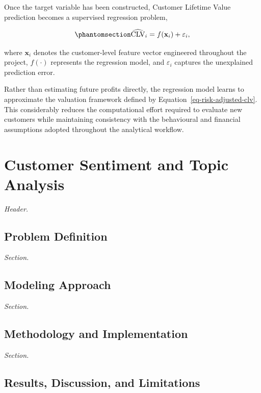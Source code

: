\documentclass[
  12pt,
  letterpaper,
]{book}
\begin{document}
Once the target variable has been constructed, Customer Lifetime Value
prediction becomes a supervised regression problem,

\begin{equation}\phantomsection\label{eq-clv-regression}{
\widehat{\mathrm{CLV}}_i
=
f(\mathbf{x}_i)+\varepsilon_i,
}\end{equation}

where \(\mathbf{x}_i\) denotes the customer-level feature vector
engineered throughout the project, \(f(\cdot)\) represents the
regression model, and \(\varepsilon_i\) captures the unexplained
prediction error.

Rather than estimating future profits directly, the regression model
learns to approximate the valuation framework defined by
Equation~\ref{eq-risk-adjusted-clv}. This considerably reduces the
computational effort required to evaluate new customers while
maintaining consistency with the behavioural and financial assumptions
adopted throughout the analytical workflow.

\chapter{Customer Sentiment and Topic
Analysis}\label{customer-sentiment-and-topic-analysis}

\emph{Header.}

\section{Problem Definition}\label{problem-definition-5}

\emph{Section.}

\section{Modeling Approach}\label{modeling-approach-5}

\emph{Section.}

\section{Methodology and
Implementation}\label{methodology-and-implementation-5}

\emph{Section.}

\section{Results, Discussion, and
Limitations}\label{results-discussion-and-limitations-5}
\end{document}
